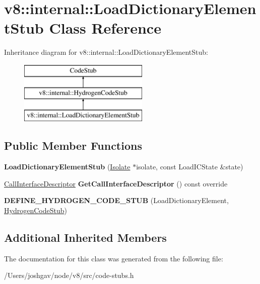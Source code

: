 \hypertarget{classv8_1_1internal_1_1_load_dictionary_element_stub}{}\section{v8\+:\+:internal\+:\+:Load\+Dictionary\+Element\+Stub Class Reference}
\label{classv8_1_1internal_1_1_load_dictionary_element_stub}
Inheritance diagram for v8\+:\+:internal\+:\+:Load\+Dictionary\+Element\+Stub\+:\begin{figure}[H]
\begin{center}
\leavevmode
\includegraphics[height=3.000000cm]{classv8_1_1internal_1_1_load_dictionary_element_stub}
\end{center}
\end{figure}
\subsection*{Public Member Functions}
\begin{DoxyCompactItemize}
\item 
{\bfseries Load\+Dictionary\+Element\+Stub} (\hyperlink{classv8_1_1internal_1_1_isolate}{Isolate} $\ast$isolate, const Load\+I\+C\+State \&state)\hypertarget{classv8_1_1internal_1_1_load_dictionary_element_stub_aa04f40db4b759103959ae48f65fa72b1}{}\label{classv8_1_1internal_1_1_load_dictionary_element_stub_aa04f40db4b759103959ae48f65fa72b1}

\item 
\hyperlink{classv8_1_1internal_1_1_call_interface_descriptor}{Call\+Interface\+Descriptor} {\bfseries Get\+Call\+Interface\+Descriptor} () const  override\hypertarget{classv8_1_1internal_1_1_load_dictionary_element_stub_a986022fd7a1acf93a3f31071f6ae03fd}{}\label{classv8_1_1internal_1_1_load_dictionary_element_stub_a986022fd7a1acf93a3f31071f6ae03fd}

\item 
{\bfseries D\+E\+F\+I\+N\+E\+\_\+\+H\+Y\+D\+R\+O\+G\+E\+N\+\_\+\+C\+O\+D\+E\+\_\+\+S\+T\+UB} (Load\+Dictionary\+Element, \hyperlink{classv8_1_1internal_1_1_hydrogen_code_stub}{Hydrogen\+Code\+Stub})\hypertarget{classv8_1_1internal_1_1_load_dictionary_element_stub_ae953aa087ad8167df9d045f710e1313d}{}\label{classv8_1_1internal_1_1_load_dictionary_element_stub_ae953aa087ad8167df9d045f710e1313d}

\end{DoxyCompactItemize}
\subsection*{Additional Inherited Members}


The documentation for this class was generated from the following file\+:\begin{DoxyCompactItemize}
\item 
/\+Users/joshgav/node/v8/src/code-\/stubs.\+h\end{DoxyCompactItemize}

